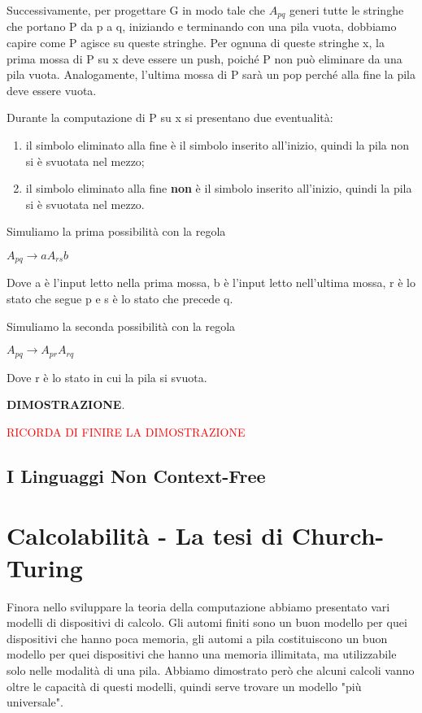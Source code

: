 \documentclass{article}
\begin{document}
Successivamente, per progettare G in modo tale che $A_{pq}$ generi tutte le stringhe che portano P da p a q, iniziando e terminando con una pila vuota, dobbiamo capire come P agisce su queste stringhe. Per ognuna di queste stringhe x, la prima mossa di P su x deve essere un push, poiché P non può eliminare da una pila vuota. Analogamente, l'ultima mossa di P sarà un pop perché alla fine la pila deve essere vuota.

Durante la computazione di P su x si presentano due eventualità:

\begin{enumerate}
    \item il simbolo eliminato alla fine è il simbolo inserito all'inizio, quindi la pila non si è svuotata nel mezzo;
    \item il simbolo eliminato alla fine \textbf{non} è il simbolo inserito all'inizio, quindi la pila si è svuotata nel mezzo.
\end{enumerate}

Simuliamo la prima possibilità con la regola

\begin{center}
    $A_{pq} \rightarrow aA_{rs}b$
\end{center}

Dove a è l'input letto nella prima mossa, b è l'input letto nell'ultima mossa, r è lo stato che segue p e s è lo stato che precede q.

Simuliamo la seconda possibilità con la regola

\begin{center}
    $A_{pq} \rightarrow A_{pr}A_{rq}$
\end{center}

Dove r è lo stato in cui la pila si svuota.

\textbf{DIMOSTRAZIONE}. 

\textcolor{red}{RICORDA DI FINIRE LA DIMOSTRAZIONE}

\subsection{I Linguaggi Non Context-Free}

\section{Calcolabilità - La tesi di Church-Turing}

Finora nello sviluppare la teoria della computazione abbiamo presentato vari modelli di dispositivi di calcolo. Gli automi finiti sono un buon modello per quei dispositivi che hanno poca memoria, gli automi a pila costituiscono un buon modello per quei dispositivi che hanno una memoria illimitata, ma utilizzabile solo nelle modalità di una pila. Abbiamo dimostrato però che alcuni calcoli vanno oltre le capacità di questi modelli, quindi serve trovare un modello "più universale".
\end{document}
